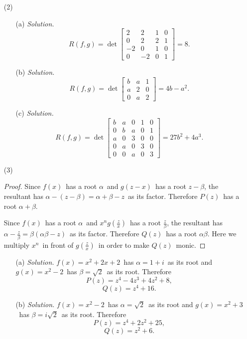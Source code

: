 \documentclass[12pt]{article}
\begin{document}
\begin{enumerate}
\begin{enumerate}
		\item[(2)]
		\begin{enumerate}
		    \item[(a)]
		    \textit{Solution.}
                $$R(f,g)=\det
                \begin{bmatrix}
                    2&2&1&0\\
                    0&2&2&1\\
                    -2&0&1&0\\
                    0&-2&0&1
                \end{bmatrix}
                =8.$$
		    \item[(b)]
		    \textit{Solution.}
                $$R(f,g)=\det
                \begin{bmatrix}
                    b&a&1\\
                    a&2&0\\
                    0&a&2
                \end{bmatrix}
                =4b-a^2.$$
		    \item[(c)]
		    \textit{Solution.}
                $$R(f,g)=\det
                \begin{bmatrix}
                    b&a&0&1&0\\
                    0&b&a&0&1\\
                    a&0&3&0&0\\
                    0&a&0&3&0\\
                    0&0&a&0&3
                \end{bmatrix}
                =27b^2+4a^3.$$
		\end{enumerate}
		\item[(3)]
		\begin{proof}
		    Since $f(x)$\ has a root $\alpha$\ and $g(z-x)$\ has a root $z-\beta$, the resultant has $\alpha-(z-\beta)=\alpha+\beta-z$\ as its factor. Therefore $P(z)$\ has a root $\alpha+\beta$.\par
		    \quad Since $f(x)$\ has a root $\alpha$\ and $x^ng(\frac{z}{x})$\ has a root $\frac{z}{\beta}$, the resultant has $\alpha-\frac{z}{\beta}=\beta(\alpha\beta-z)$\ as its factor. Therefore $Q(z)$\ has a root $\alpha\beta$. Here we multiply $x^n$\ in front of $g(\frac{z}{x})$\ in order to make $Q(z)$\ monic.
		\end{proof}
		\begin{enumerate}
		    \item[(a)]
		    \textit{Solution.}
	            $f(x)=x^2+2x+2$\ has $\alpha=1+i$\ as its root and $g(x)=x^2-2$\ has $\beta=\sqrt{2}$\ as its root. Therefore
	            $$P(z)=z^4-4z^3+4z^2+8,$$
	            $$Q(z)=z^4+16.$$
            \item[(b)]
            \textit{Solution.}
                $f(x)=x^2-2$\ has $\alpha=\sqrt{2}$\ as its root and $g(x)=x^2+3$\ has $\beta=i\sqrt{2}$\ as its root. Therefore
	            $$P(z)=z^4+2z^2+25,$$
	            $$Q(z)=z^2+6.$$
		\end{enumerate}
	\end{enumerate}
\end{enumerate}
\end{document}
